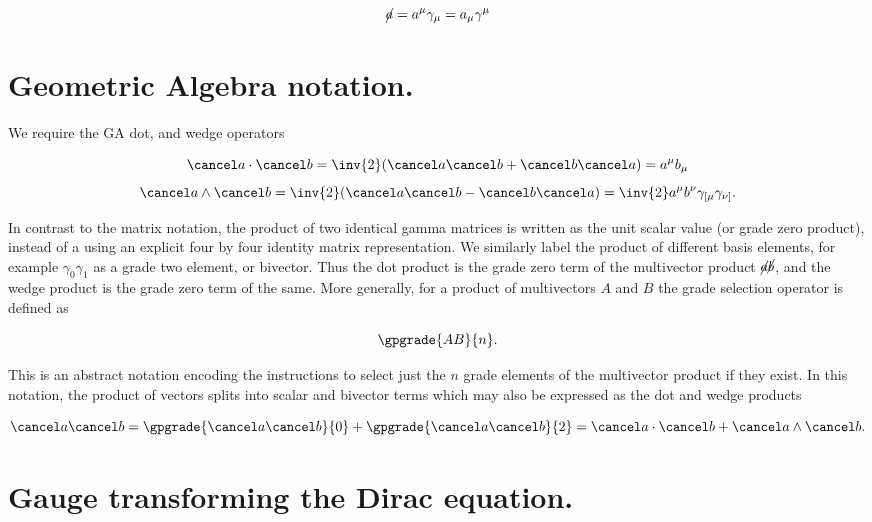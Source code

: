 \begin{equation}\label{eqn:diracCovariant:50}
\cancel{a} = a^\mu \gamma_\mu = a_\mu \gamma^\mu
\end{equation}

\section{Geometric Algebra notation.}

We require the GA dot, and wedge operators

\begin{equation}\label{eqn:diracCovariant:70}
\aslash \cdot \bslash = \inv{2}( \aslash \bslash + \bslash \aslash ) = a^\mu b_\mu
\end{equation}
\begin{equation}\label{eqn:diracCovariant:90}
\aslash \wedge \bslash = \inv{2}( \aslash \bslash - \bslash \aslash ) = \inv{2} a^\mu b^\nu \gamma_{[\mu} \gamma_{\nu]}.
\end{equation}

In contrast to the matrix notation, the product of two identical gamma matrices is written as the unit scalar value (or grade zero product), instead of a using an explicit four by four identity matrix representation.  We similarly label the product of different basis elements, for example $\gamma_0 \gamma_1$ as a grade two element, or bivector.  Thus the dot product is the grade zero term of the multivector product $\cancel{a} \cancel{b}$, and the wedge product is the grade zero term of the same.  More generally, for a product of multivectors $A$ and $B$ the grade selection operator is defined as

\begin{equation}\label{eqn:diracCovariant:110}
\gpgrade{A B}{n}.
\end{equation}

This is an abstract notation encoding the instructions to select just the $n$ grade elements of the multivector product if they exist.  In this notation, the product of vectors splits into scalar and bivector terms which may also be expressed as the dot and wedge products

\begin{equation}\label{eqn:diracCovariant:130}
\aslash \bslash = \gpgrade{\aslash \bslash}{0} + \gpgrade{\aslash \bslash}{2} = \aslash \cdot \bslash + \aslash \wedge \bslash.
\end{equation}

\section{Gauge transforming the Dirac equation.}

